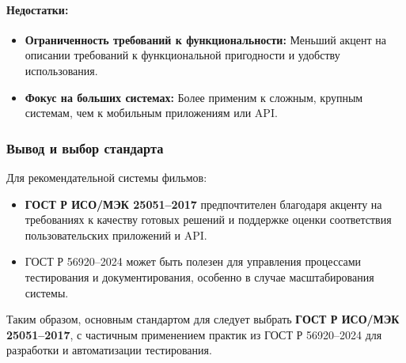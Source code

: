 \paragraph{Недостатки:}
\begin{itemize}
    \item \textbf{Ограниченность требований к функциональности:} Меньший акцент на описании требований к функциональной пригодности и удобству использования.
    \item \textbf{Фокус на больших системах:} Более применим к сложным, крупным системам, чем к мобильным приложениям или API.
\end{itemize}

\subsubsection*{Вывод и выбор стандарта}

Для рекомендательной системы фильмов:
\begin{itemize}
    \item \textbf{ГОСТ Р ИСО/МЭК 25051--2017} предпочтителен благодаря акценту на требованиях к качеству
    готовых решений и поддержке оценки соответствия пользовательских приложений и API.
    \item ГОСТ Р 56920--2024 может быть полезен для управления процессами тестирования и документирования, особенно в случае масштабирования системы.
\end{itemize}
Таким образом, основным стандартом для следует выбрать \textbf{ГОСТ Р ИСО/МЭК 25051--2017},
с частичным применением практик из ГОСТ Р 56920--2024 для разработки и автоматизации тестирования.
